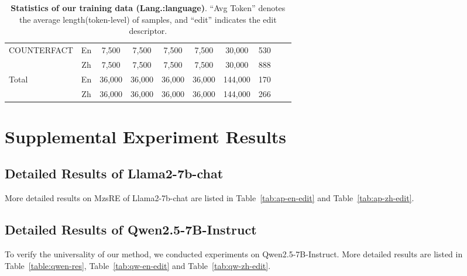 \begin{table*}[!t]
{\begin{tabular}{lccc ccc ccc}
\multirow{2}{*}{COUNTERFACT} & En & 7,500                     & 7,500                      & 7,500                         & 7,500                          & 30,000      & 530          \\ 
& Zh & 7,500                     & 7,500                      & 7,500                         & 7,500                          & 30,000      & 888          \\ \midrule
\multirow{2}{*}{Total}   & En    & 36,000                    & 36,000                    & 36,000                 & 36,000                       & 144,000    & 170 \\
& Zh    & 36,000                    & 36,000                    & 36,000                 & 36,000                       & 144,000    & 266 \\
\bottomrule
\end{tabular}
}
\caption{\textbf{Statistics of our training data (Lang.:language)}. ``Avg Token'' denotes the average length(token-level) of samples, and ``edit'' indicates the edit descriptor.}
\label{tab:statistics}
\end{table*}



\section{Supplemental Experiment Results}
\label{sec:appendix_experiment}

\subsection{Detailed Results of Llama2-7b-chat}
\label{sec:appendix_ex_llama2}
More detailed results on MzsRE of Llama2-7b-chat are listed in Table~\ref{tab:ap-en-edit} and Table~\ref{tab:ap-zh-edit}.

\subsection{Detailed Results of Qwen2.5-7B-Instruct}
\label{sec:appendix_ex_qwen2}
To verify the universality of our method, we conducted experiments on Qwen2.5-7B-Instruct. More detailed results are listed in Table~\ref{table:qwen-res}, Table~\ref{tab:qw-en-edit} and Table~\ref{tab:qw-zh-edit}.


